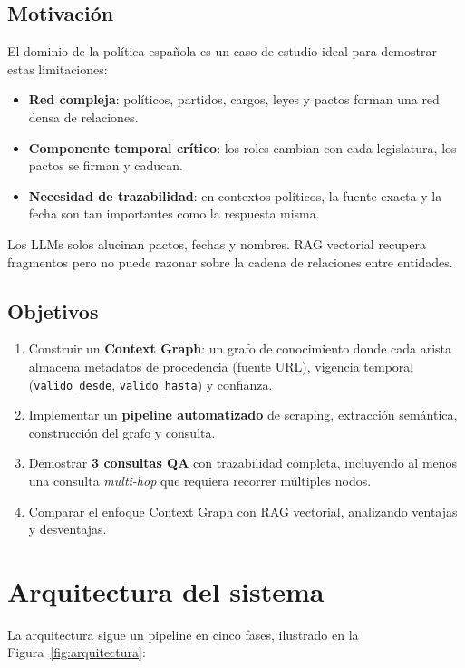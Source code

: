 \documentclass[12pt,a4paper]{article}
\begin{document}
\subsection{Motivaci\'on}

El dominio de la política española es un caso de estudio ideal para demostrar estas limitaciones:
\begin{itemize}
  \item \textbf{Red compleja}: políticos, partidos, cargos, leyes y pactos forman una red densa de relaciones.
  \item \textbf{Componente temporal crítico}: los roles cambian con cada legislatura, los pactos se firman y caducan.
  \item \textbf{Necesidad de trazabilidad}: en contextos políticos, la fuente exacta y la fecha son tan importantes como la respuesta misma.
\end{itemize}
Los LLMs solos alucinan pactos, fechas y nombres. RAG vectorial recupera fragmentos pero no puede razonar sobre la cadena de relaciones entre entidades.

\subsection{Objetivos}

\begin{enumerate}
  \item Construir un \textbf{Context Graph}: un grafo de conocimiento donde cada arista almacena metadatos de procedencia (fuente URL), vigencia temporal (\texttt{valido\_desde}, \texttt{valido\_hasta}) y confianza.
  \item Implementar un \textbf{pipeline automatizado} de scraping, extracción semántica, construcción del grafo y consulta.
  \item Demostrar \textbf{3 consultas QA} con trazabilidad completa, incluyendo al menos una consulta \textit{multi-hop} que requiera recorrer múltiples nodos.
  \item Comparar el enfoque Context Graph con RAG vectorial, analizando ventajas y desventajas.
\end{enumerate}

\section{Arquitectura del sistema}
\label{sec:arquitectura}

La arquitectura sigue un pipeline en cinco fases, ilustrado en la Figura~\ref{fig:arquitectura}:
\end{document}
